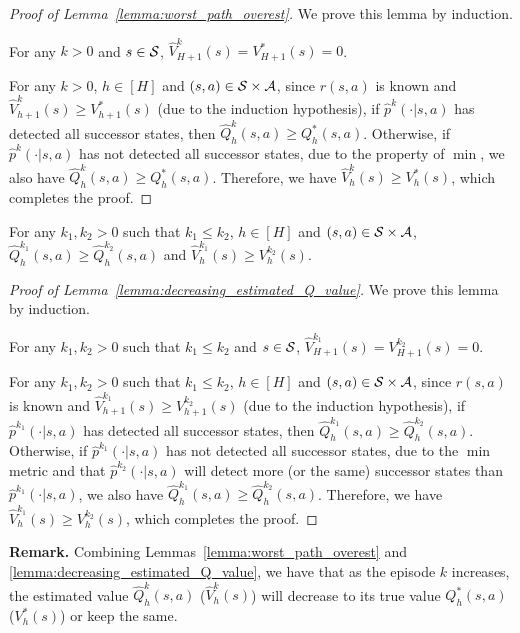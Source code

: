 \begin{proof}[Proof of Lemma~\ref{lemma:worst_path_overest}]
	We prove this lemma by induction.
	
	
	For any $k>0$ and $s \in \mathcal{S}$, $\hat{V}^k_{H+1}(s)=V^{*}_{H+1}(s)=0$.
	
	For any $k>0$, $h \in [H]$ and $(s,a) \in \mathcal{S} \times \mathcal{A}$, since $r(s,a)$ is known and $\hat{V}^k_{h+1}(s) \geq V^{*}_{h+1}(s)$ (due to the induction hypothesis), if $\hat{p}^k(\cdot|s,a)$ has detected all successor states, then $\hat{Q}^{k}_h(s,a) \geq Q^{*}_h(s,a)$. Otherwise, if $\hat{p}^k(\cdot|s,a)$ has not detected all successor states, due to the property of $\min$, we also have $\hat{Q}^{k}_h(s,a) \geq Q^{*}_h(s,a)$. Therefore, we have $\hat{V}^{k}_h(s) \geq V^{*}_h(s)$, which completes the proof.
\end{proof}

\begin{lemma} \label{lemma:decreasing_estimated_Q_value}
	For any $k_1,k_2>0$ such that $k_1 \leq k_2$, $h \in [H]$ and $(s,a) \in \mathcal{S} \times \mathcal{A}$, $\hat{Q}^{k_1}_h(s,a) \geq \hat{Q}^{k_2}_h(s,a)$ and $\hat{V}^{k_1}_h(s) \geq V^{k_2}_h(s)$. 
\end{lemma}
\begin{proof}[Proof of Lemma~\ref{lemma:decreasing_estimated_Q_value}]
	We prove this lemma by induction.
	
	For any $k_1,k_2>0$ such that $k_1 \leq k_2$ and $s \in \mathcal{S}$, $\hat{V}^{k_1}_{H+1}(s) = V^{k_2}_{H+1}(s)=0$.
	
	For any $k_1,k_2>0$ such that $k_1 \leq k_2$, $h \in [H]$ and $(s,a) \in \mathcal{S} \times \mathcal{A}$, since $r(s,a)$ is known and $\hat{V}^{k_1}_{h+1}(s) \geq V^{k_2}_{h+1}(s)$ (due to the induction hypothesis), if $\hat{p}^{k_1}(\cdot|s,a)$ has detected all successor states, then $\hat{Q}^{k_1}_h(s,a) \geq \hat{Q}^{k_2}_h(s,a)$. Otherwise, if $\hat{p}^{k_1}(\cdot|s,a)$ has not detected all successor states, due to the $\min$ metric and that $\hat{p}^{k_2}(\cdot|s,a)$ will detect more (or the same) successor states than $\hat{p}^{k_1}(\cdot|s,a)$, we also have $\hat{Q}^{k_1}_h(s,a) \geq \hat{Q}^{k_2}_h(s,a)$. Therefore, we have $\hat{V}^{k_1}_h(s) \geq V^{k_2}_h(s)$, which completes the proof.
\end{proof}
\textbf{Remark.} Combining Lemmas~\ref{lemma:worst_path_overest} and \ref{lemma:decreasing_estimated_Q_value}, we have that as the episode $k$ increases, the estimated value $\hat{Q}^{k}_h(s,a)$ ($\hat{V}^{k}_h(s)$) will decrease to its true value $Q^{*}_h(s,a)$ ($V^{*}_h(s)$) or keep the same.

